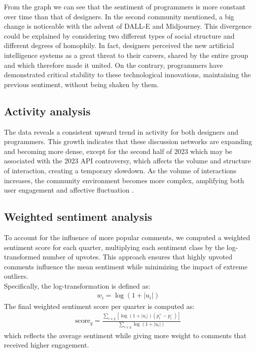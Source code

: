 \documentclass[conference]{IEEEtran}
\begin{document}
From the graph we can see that the sentiment of programmers is more constant over time than that of designers. In the second community mentioned, a big change is noticeable with the advent of DALL-E and Midjourney. This divergence could be explained by considering two different types of social structure and different degrees of homophily. In fact, designers perceived the new artificial intelligence systems as a great threat to their careers, shared by the entire group and which therefore made it united. On the contrary, programmers have demonstrated critical stability to these technological innovations, maintaining the previous sentiment, without being shaken by them.

\subsection{Activity analysis}
The data reveals a consistent upward trend in activity for both designers and programmers. This growth indicates that these discussion networks are expanding and becoming more dense, except for the second half of 2023 which may be associated with the 2023 API controversy, which affects the volume and structure of interaction, creating a temporary slowdown. As the volume of interactions increases, the community environment becomes more complex, amplifying both user engagement and affective fluctuation \cite{b28}.

\subsection{Weighted sentiment analysis}
To account for the influence of more popular comments, we computed a weighted sentiment score for each quarter, multiplying each sentiment class by the log-transformed number of upvotes. This approach ensures that highly upvoted comments influence the mean sentiment while minimizing the impact of extreme outliers.\\
Specifically, the log-transformation is defined as:
\begin{align*}
    w_i = \log(1 + |u_i|)
\end{align*}
The final weighted sentiment score per quarter is computed as:
\begin{align*}
    \text{score}_q = \frac{\sum_{i \in q} [\log(1 + |u_i|)(p_i^+ - p_i^-)]}{\sum_{i \in q} \log(1 + |u_i|)}
\end{align*}
which reflects the average sentiment while giving more weight to comments that received higher engagement.\\
\end{document}
